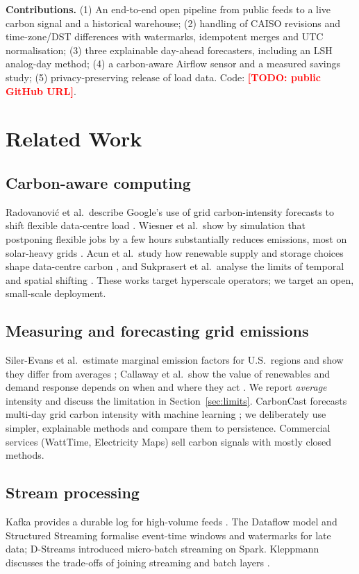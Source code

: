 \documentclass[conference]{IEEEtran}
\newcommand{\TODO}[1]{\textcolor{red}{\textbf{[TODO: #1]}}}   %
\begin{document}
\textbf{Contributions.} (1) An end-to-end open pipeline from public feeds to a live carbon signal and a historical warehouse; (2) handling of CAISO revisions and time-zone/DST differences with watermarks, idempotent merges and UTC normalisation; (3) three explainable day-ahead forecasters, including an LSH analog-day method; (4) a carbon-aware Airflow sensor and a measured savings study; (5) privacy-preserving release of load data. Code: \TODO{public GitHub URL}.

\section{Related Work}
\subsection{Carbon-aware computing}
Radovanovi\'c et al.\ describe Google's use of grid carbon-intensity forecasts to shift flexible data-centre load \cite{radovanovic}. Wiesner et al.\ show by simulation that postponing flexible jobs by a few hours substantially reduces emissions, most on solar-heavy grids \cite{wiesner}. Acun et al.\ study how renewable supply and storage choices shape data-centre carbon \cite{acun}, and Sukprasert et al.\ analyse the limits of temporal and spatial shifting \cite{sukprasert}. These works target hyperscale operators; we target an open, small-scale deployment.
\subsection{Measuring and forecasting grid emissions}
Siler-Evans et al.\ estimate marginal emission factors for U.S.\ regions and show they differ from averages \cite{silerevans}; Callaway et al.\ show the value of renewables and demand response depends on when and where they act \cite{callaway}. We report \emph{average} intensity and discuss the limitation in Section~\ref{sec:limits}. CarbonCast forecasts multi-day grid carbon intensity with machine learning \cite{carboncast}; we deliberately use simpler, explainable methods and compare them to persistence.
Commercial services (WattTime, Electricity Maps) sell carbon signals with mostly closed methods.
\subsection{Stream processing}
Kafka provides a durable log for high-volume feeds \cite{kreps}. The Dataflow model \cite{akidau} and Structured Streaming \cite{armbrust} formalise event-time windows and watermarks for late data; D-Streams \cite{zaharia} introduced micro-batch streaming on Spark. Kleppmann discusses the trade-offs of joining streaming and batch layers \cite{kleppmann}.
\end{document}
